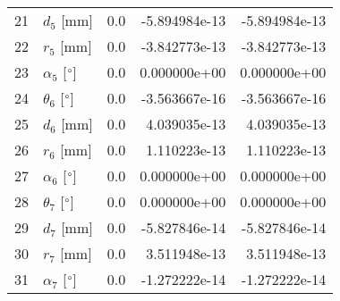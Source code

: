 \documentclass{standalone}%
\begin{document}
\begin{tabular}{llrrr}
21 &              $d_{5}$ [mm] &      0.0 & -5.894984e-13 & -5.894984e-13 \\
22 &              $r_{5}$ [mm] &      0.0 & -3.842773e-13 & -3.842773e-13 \\
23 &  $\alpha_{5}$ [$\degree$] &      0.0 &  0.000000e+00 &  0.000000e+00 \\
24 &  $\theta_{6}$ [$\degree$] &      0.0 & -3.563667e-16 & -3.563667e-16 \\
25 &              $d_{6}$ [mm] &      0.0 &  4.039035e-13 &  4.039035e-13 \\
26 &              $r_{6}$ [mm] &      0.0 &  1.110223e-13 &  1.110223e-13 \\
27 &  $\alpha_{6}$ [$\degree$] &      0.0 &  0.000000e+00 &  0.000000e+00 \\
28 &  $\theta_{7}$ [$\degree$] &      0.0 &  0.000000e+00 &  0.000000e+00 \\
29 &              $d_{7}$ [mm] &      0.0 & -5.827846e-14 & -5.827846e-14 \\
30 &              $r_{7}$ [mm] &      0.0 &  3.511948e-13 &  3.511948e-13 \\
31 &  $\alpha_{7}$ [$\degree$] &      0.0 & -1.272222e-14 & -1.272222e-14 \\
\bottomrule
\end{tabular}
%
\end{document}

